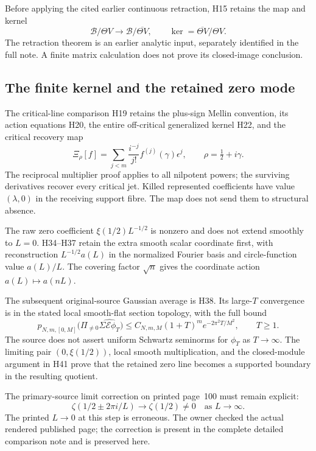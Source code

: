 Before applying the cited earlier continuous retraction, H15 retains
the map and kernel
\[
 \mathscr B/\Theta V\longrightarrow
 \mathscr B/\overline{\Theta V},\qquad
 \ker=\overline{\Theta V}/\Theta V.
\]
The retraction theorem is an earlier analytic input, separately
identified in the full note. A finite matrix calculation does not
prove its closed-image conclusion.

\subsection{The finite kernel and the retained zero mode}

The critical-line comparison H19 retains the plus-sign Mellin
convention, its action equations H20, the entire off-critical
generalized kernel H22, and the critical recovery map
\[
 \Xi_\rho[f]=\sum_{j<m}\frac{i^{-j}}{j!}
 f^{(j)}(\gamma)\epsilon^j,
 \qquad\rho=\tfrac12+i\gamma.
\]
The reciprocal multiplier proof applies to all nilpotent powers;
the surviving derivatives recover every critical jet.
Killed represented coefficients have value $(\lambda,0)$ in
the receiving support fibre. The map does not send them to
structural absence.

The raw zero coefficient $\xi(1/2)L^{-1/2}$ is nonzero and does
not extend smoothly to $L=0$. H34--H37 retain the extra smooth
scalar coordinate first, with reconstruction $L^{-1/2}a(L)$ in
the normalized Fourier basis and circle-function value $a(L)/L$.
The covering factor $\sqrt n$ gives the coordinate action
$a(L)\mapsto a(nL)$.

The subsequent original-source Gaussian average is H38. Its
large-$T$ convergence is in the stated local smooth-flat section
topology, with the full bound
\[
 p_{N,m,[0,M]}
 \bigl(\Pi_{\ne0}\widehat{\Sigma\mathcal E\phi_T}\bigr)
 \le C_{N,m,M}(1+T)^m e^{-2\pi^2T/M^2},\qquad T\ge1.
\]
The source does not assert uniform Schwartz seminorms for
$\phi_T$ as $T\to\infty$. The limiting pair
$(0,\xi(1/2))$, local smooth multiplication, and the closed-module
argument in H41 prove that the retained zero line becomes a
supported boundary in the resulting quotient.

The primary-source limit correction on printed page~100 must
remain explicit:
\[
 \zeta(1/2\pm2\pi i/L)\longrightarrow\zeta(1/2)\ne0
 \quad\text{as }L\longrightarrow\infty.
\]
The printed $L\to0$ at this step is erroneous. The owner checked
the actual rendered published page; the correction is present in
the complete detailed comparison note and is preserved here.

